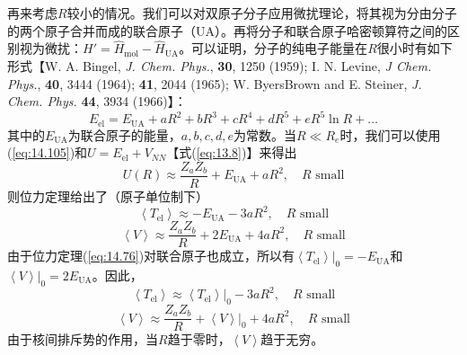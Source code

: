     再来考虑$R$较小的情况。我们可以对双原子分子应用微扰理论，将其视为分由分子的两个原子合并而成的联合原子（UA）。再将分子和联合原子哈密顿算符之间的区别视为微扰：$H' = \hat{H}_{\text{mol}} - \hat{H}_{\text{UA}}$。可以证明，分子的纯电子能量在$R$很小时有如下形式【W. A. Bingel, \textit{J. Chem. Phys.}, \textbf{30}, 1250 (1959); I. N. Levine, \textit{J Chem. Phys.}, \textbf{40}, 3444 (1964); \textbf{41}, 2044 (1965); W. ByersBrown and E. Steiner, \textit{J. Chem. Phys.} \textbf{44}, 3934 (1966)】：
    \begin{equation}
        E_{\text{el}} = E_{\text{UA}} + aR^2 + bR^3 + cR^4 + dR^5 + eR^5 \ln R + \ldots
        \label{eq:14.105}
    \end{equation}
    其中的$E_{\text{UA}}$为联合原子的能量，$a, b, c, d, e$为常数。当$R \ll R_e$时，我们可以使用(\ref{eq:14.105})和$U = E_{\text{el}} + V_{NN}$【式(\ref{eq:13.8})】来得出
    \begin{equation}
        U\left(R\right) \approx \frac{Z_a Z_b}{R} + E_{\text{UA}} + aR^2, \quad R \text{ small}
        \label{eq:14.106}
    \end{equation}
    则位力定理给出了（原子单位制下）
    \begin{equation*}
        \left\langle T_{\text{el}} \right\rangle \approx -E_{\text{UA}} - 3aR^2, \quad R \text{ small}
    \end{equation*}
    \begin{equation*}
        \left\langle V \right\rangle \approx \frac{Z_a Z_b}{R} + 2E_{\text{UA}} + 4aR^2, \quad R \text{ small}
    \end{equation*}
    由于位力定理(\ref{eq:14.76})对联合原子也成立，所以有$\left. \left\langle T_{\text{el}} \right\rangle \right|_0 = -E_{\text{UA}}$和$\left. \left\langle V \right\rangle \right|_0 = 2E_{\text{UA}}$。因此，
    \begin{equation}
        \left\langle T_{\text{el}} \right\rangle \approx \left. \left\langle T_{\text{el}} \right\rangle \right|_0 - 3aR^2, \quad R \text{ small}
        \label{eq:14.107}
    \end{equation}
    \begin{equation}
        \left\langle V \right\rangle \approx  \frac{Z_a Z_b}{R} + \left. \left\langle V \right\rangle \right|_0 + 4aR^2, \quad R \text{ small}
        \label{eq:14.108}
    \end{equation}
    由于核间排斥势的作用，当$R$趋于零时，$\left\langle V \right\rangle$趋于无穷。

